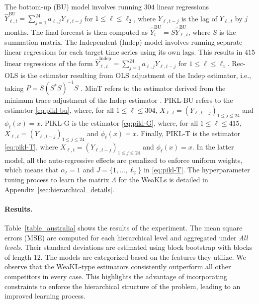 The bottom-up (BU) model involves running $304$ linear regressions $\hat Y^{\mathrm{BU}}_{\ell,t} = \sum_{j=1}^{24}a_{\ell, j}Y_{\ell,t-j}$ for $1\leq \ell \leq \ell_2$, where $Y_{\ell,t-j}$ is the lag of $Y_{\ell, t}$ by $j$ months. 
The final forecast is then computed as $\hat Y^{\mathrm{BU}}_{t} = S\hat Y^{\mathrm{BU}}_{\ell,t}$,  where $S$ is the summation matrix.  
The Independent (Indep) model involves running separate linear regressions for each target time series using its own lags. This results in $415$ linear regressions of the form $\hat Y^{\mathrm{Indep}}_{\ell,t} = \sum_{j=1}^{24}a_{\ell, j}Y_{\ell,t-j}$ for $1\leq \ell \leq \ell_1$. 
Rec-OLS is the estimator resulting from OLS adjustment of the Indep estimator, i.e., taking $P = S(S^\ast S)^{-1}S$ \citep{Wickramasuriya2019optimal}. 
MinT refers to the estimator derived from the minimum trace adjustment of the Indep estimator \citep[see MinT(shrinkage) in][]{Wickramasuriya2019optimal}.
PIKL-BU refers to the estimator \eqref{eq:pikl-bu}, where, for all $1\leq \ell \leq 304$, $X_{\ell,t} = (Y_{\ell, t-j})_{1\leq j \leq 24}$ and $\phi_\ell(x) = x$.
PIKL-G is the estimator \eqref{eq:pikl-G}, where, for all $1\leq \ell \leq 415$, $X_{\ell,t} = (Y_{\ell, t-j})_{1\leq j \leq 24}$ and $\phi_\ell(x) = x$. 
Finally, PIKL-T is the estimator \eqref{eq:pikl-T}, where $X_{\ell,t} = (Y_{\ell, t-j})_{1\leq j \leq 24}$ and $\phi_\ell(x) = x$. 
In the latter model, all the auto-regressive effects are penalized to enforce uniform weights, which means that $\alpha_\ell = 1$ and $J = \{1, \hdots, \ell_2\}$ in \eqref{eq:pikl-T}.
The hyperparameter tuning process to learn the matrix $\Lambda$ for the WeaKLs is detailed in Appendix~\ref{sec:hierarchical_details}.

\paragraph{Results.} Table~\ref{table_australia} shows the results of the experiment. The mean square errors (MSE) are computed for each hierarchical level and aggregated under {\it All levels}. 
Their standard deviations are estimated using block bootstrap with blocks of length $12$.
The models are categorized based on the features they utilize.
We observe that the WeaKL-type estimators consistently outperform all other competitors in every case. This highlights the advantage of incorporating constraints to enforce the hierarchical structure of the problem, leading to an improved learning process.


